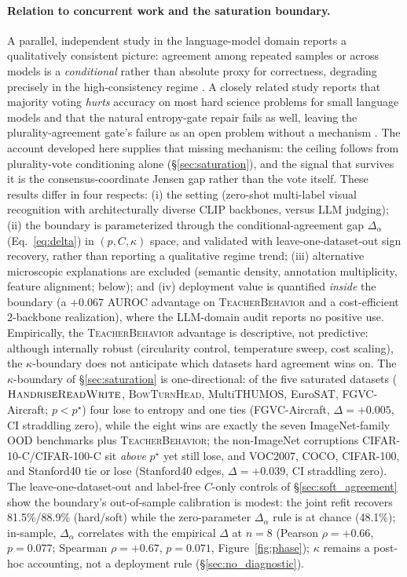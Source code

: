 \documentclass[a4paper,fleqn]{cas-sc}
\newcommand{\tb}{\textsc{TeacherBehavior}}
\newcommand{\hrw}{\textsc{HandriseReadWrite}}
\newcommand{\bth}{\textsc{BowTurnHead}}
\begin{document}
\paragraph{Relation to concurrent work and the saturation boundary.}
\label{sec:elimination}
A parallel, independent study in the language-model domain reports a qualitatively consistent picture: agreement among repeated samples or across models is a \emph{conditional} rather than absolute proxy for correctness, degrading precisely in the high-consistency regime \citep{ding2026agree}.
A closely related study reports that majority voting \emph{hurts} accuracy on most hard science problems for small language models and that the natural entropy-gate repair fails as well, leaving the plurality-agreement gate's failure as an open problem without a mechanism \citep{bahuguna2026backfires}.
The account developed here supplies that missing mechanism: the ceiling follows from plurality-vote conditioning alone (\S\ref{sec:saturation}), and the signal that survives it is the consensus-coordinate Jensen gap rather than the vote itself.
These results differ in four respects: (i) the setting (zero-shot multi-label visual recognition with architecturally diverse CLIP backbones, versus LLM judging); (ii) the boundary is parameterized through the conditional-agreement gap $\Delta_\alpha$ (Eq.~\eqref{eq:delta}) in $(p, C, \kappa)$ space, and validated with leave-one-dataset-out sign recovery, rather than reporting a qualitative regime trend; (iii) alternative microscopic explanations are excluded (semantic density, annotation multiplicity, feature alignment; below); and (iv) deployment value is quantified \emph{inside} the boundary (a $+0.067$ AUROC advantage on \tb{} and a cost-efficient 2-backbone realization), where the LLM-domain audit reports no positive use.
Empirically, the \tb{} advantage is descriptive, not predictive: although internally robust (circularity control, temperature sweep, cost scaling), the $\kappa$-boundary does not anticipate which datasets hard agreement wins on.
The $\kappa$-boundary of \S\ref{sec:saturation} is one-directional: of the five saturated datasets ($\hrw$, \bth, MultiTHUMOS, EuroSAT, FGVC-Aircraft; $p < p^\star$) four lose to entropy and one ties (FGVC-Aircraft, $\Delta = +0.005$, CI straddling zero), while the eight wins are exactly the seven ImageNet-family OOD benchmarks plus \tb{}; the non-ImageNet corruptions CIFAR-10-C/CIFAR-100-C sit \emph{above} $p^\star$ yet still lose, and VOC2007, COCO, CIFAR-100, and Stanford40 tie or lose (Stanford40 edges, $\Delta = +0.039$, CI straddling zero).
The leave-one-dataset-out and label-free $C$-only controls of \S\ref{sec:soft_agreement} show the boundary's out-of-sample calibration is modest: the joint refit recovers 81.5\%/88.9\% (hard/soft) while the zero-parameter $\Delta_\alpha$ rule is at chance (48.1\%); in-sample, $\Delta_\alpha$ correlates with the empirical $\Delta$ at $n{=}8$ (Pearson $\rho = +0.66$, $p=0.077$; Spearman $\rho = +0.67$, $p=0.071$, Figure~\ref{fig:phase}); $\kappa$ remains a post-hoc accounting, not a deployment rule (\S\ref{sec:no_diagnostic}).
\end{document}
